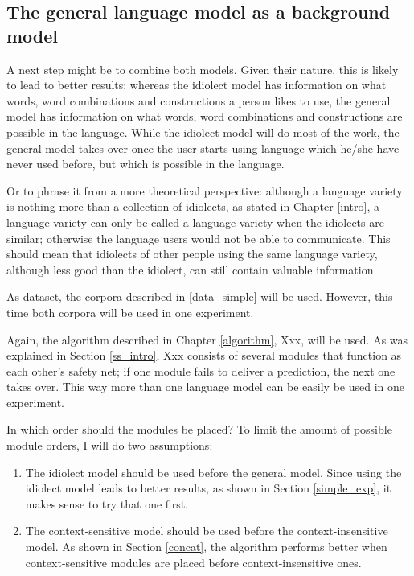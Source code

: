 \documentclass[11pt]{article}
\begin{document}
\subsection{The general language model as a background model} \label{background}

A next step might be to combine both models. Given their nature, this is likely to lead to better results: whereas the idiolect model has information on what words, word combinations and constructions a person likes to use, the general model has information on what words, word combinations and constructions are possible in the language. While the idiolect model will do most of the work, the general model takes over once the user starts using language which he/she have never used before, but which is possible in the language. 

Or to phrase it from a more theoretical perspective: although a language variety is nothing more than a collection of idiolects, as stated in Chapter \ref{intro}, a language variety can only be called a language variety when the idiolects are similar; otherwise the language users would not be able to communicate. This should mean that idiolects of other people using the same language variety, although less good than the idiolect, can still contain valuable information.


As dataset, the corpora described in \ref{data_simple} will be used. However, this time  both corpora will be used in one experiment.

Again, the algorithm described in Chapter \ref{algorithm}, Xxx, will be used. As was explained in Section \ref{ss_intro}, Xxx consists of several modules that function as each other's safety net; if one module fails to deliver a prediction, the next one takes over. This way more than one language model can be easily be used in one experiment.

In which order should the modules be placed? To limit the amount of possible module orders, I will do two assumptions:

\begin{enumerate}

\item The idiolect model should be used before the general model. Since using the idiolect model leads to better results, as shown in Section \ref{simple_exp}, it makes sense to try that one first.
\item The context-sensitive model should be used before the context-insensitive model. As shown in Section \ref{concat}, the algorithm performs better when context-sensitive modules are placed before context-insensitive ones.

\end{enumerate}
\end{document}
